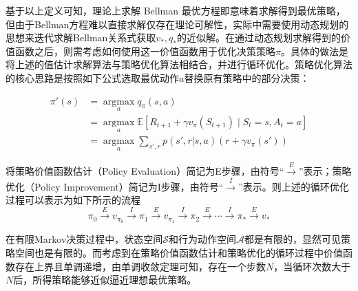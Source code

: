 


基于以上定义可知，理论上求解 Bellman 最优方程即意味着求解得到最优策略，但由于Bellman方程难以直接求解仅存在理论可解性，实际中需要使用动态规划的思想来迭代求解Bellman关系式获取$v_*,q_*$的近似解\cite{sutton2018reinforcement}。在通过动态规划求解得到的价值函数之后，则需考虑如何使用这一价值函数用于优化决策策略$\pi$。具体的做法是将上述的值估计求解算法与策略优化算法相结合，并进行循环优化。策略优化算法的核心思路是按照如下公式选取最优动作$a$替换原有策略中的部分决策：

\begin{equation}
    \begin{aligned}\pi'(s) &= \mathop{\arg\max}\limits_a q_\pi(s, a)\\&=\mathop{\arg\max}\limits_a \mathbb{E}[R_{t+1}+\gamma v_\pi(S_{t+1})\mid S_t=s,A_t=a] \\&= \mathop{\arg\max}\limits_a \sum_{s',r} p(s', r | s, a) (r + \gamma v_\pi(s'))\end{aligned}
\end{equation}

将策略价值函数估计（Policy Evaluation）简记为E步骤，由符号“$\xrightarrow{E}$”表示；策略优化（Policy Improvement）简记为I步骤，由符号“$\xrightarrow{I}$”表示。则上述的循环优化过程可以表示为如下所示的流程
\begin{equation}
\pi_0 \xrightarrow{E} v_{\pi_0} \xrightarrow{I}\pi_1 \xrightarrow{E} v_{\pi_1} \xrightarrow{I} \pi_2 \xrightarrow{E} \cdots \xrightarrow{I} \pi_* \xrightarrow{E} v_*
\end{equation}

在有限Markov决策过程中，状态空间$\mathcal{S}$和行为动作空间$\mathcal{A}$都是有限的，显然可见策略空间也是有限的。而考虑到在策略价值函数估计和策略优化的循环过程中价值函数存在上界且单调递增，由单调收敛定理可知，存在一个步数$N$，当循环次数大于$N$后，所得策略能够近似逼近理想最优策略。


